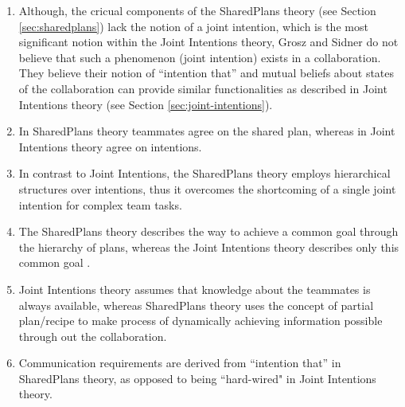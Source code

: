 \documentclass[11pt]{article}
\begin{document}
\begin{enumerate}
  \item Although, the cricual components of the SharedPlans theory (see Section
  \ref{sec:sharedplans}) lack the notion of a joint intention, which is the most
  significant notion within the Joint Intentions theory, Grosz and Sidner do not
  believe that such a phenomenon (joint intention) exists in a collaboration.
  They believe their notion of ``intention that'' and mutual beliefs about
  states of the collaboration can provide similar functionalities as described
  in Joint Intentions theory (see Section \ref{sec:joint-intentions}).
  
  \item In SharedPlans theory teammates agree on the shared plan, whereas in
  Joint Intentions theory agree on intentions.
  
  \item In contrast to Joint Intentions, the SharedPlans theory employs
  hierarchical structures over intentions, thus it overcomes the shortcoming of
  a single joint intention for complex team tasks.
  
  \item The SharedPlans theory describes the way to achieve a common goal
  through the hierarchy of plans, whereas the Joint Intentions theory describes
  only this common goal \cite{skubch:modelling-behavior-robots}.
  
  \item Joint Intentions theory assumes that knowledge about the teammates is
  always available, whereas SharedPlans theory uses the concept of partial
  plan/recipe to make process of dynamically achieving information possible
  through out the collaboration.
  
  \item Communication requirements are derived from ``intention that'' in
  SharedPlans theory, as opposed to being ``hard-wired" in Joint Intentions
  theory.
\end{enumerate}
\end{document}

